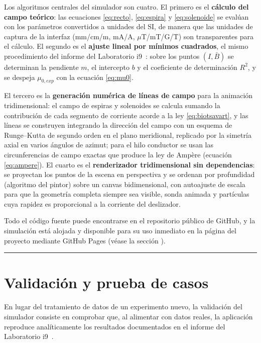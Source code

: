 \documentclass{article}
\begin{document}
Los algoritmos centrales del simulador son cuatro. El primero es el \textbf{cálculo del campo teórico}: las ecuaciones \eqref{eq:recto}, \eqref{eq:espira} y \eqref{eq:solenoide} se evalúan con los parámetros convertidos a unidades del SI, de manera que las unidades de captura de la interfaz (mm/cm/m, mA/A, $\mu$T/mT/G/T) son transparentes para el cálculo. El segundo es el \textbf{ajuste lineal por mínimos cuadrados}, el mismo procedimiento del informe del Laboratorio i9~\cite{labi9rep}: sobre los puntos $(I, \bar{B})$ se determinan la pendiente $m$, el intercepto $b$ y el coeficiente de determinación $R^2$, y se despeja $\mu_{0,exp}$ con la ecuación \eqref{eq:mu0}.

El tercero es la \textbf{generación numérica de líneas de campo} para la animación tridimensional: el campo de espiras y solenoides se calcula sumando la contribución de cada segmento de corriente acorde a la ley \eqref{eq:biotsavart}, y las líneas se construyen integrando la dirección del campo con un esquema de Runge--Kutta de segundo orden en el plano meridional, replicado por la simetría axial en varios ángulos de azimut; para el hilo conductor se usan las circunferencias de campo exactas que produce la ley de Ampère (ecuación \eqref{eq:ampere}). El cuarto es el \textbf{renderizador tridimensional sin dependencias}: se proyectan los puntos de la escena en perspectiva y se ordenan por profundidad (algoritmo del pintor) sobre un canvas bidimensional, con autoajuste de escala para que la geometría completa siempre sea visible, sonda animada y partículas cuya rapidez es proporcional a la corriente del deslizador.

Todo el código fuente puede encontrarse en el repositorio público de GitHub, y la simulación está alojada y disponible para su uso inmediato en la página del proyecto mediante GitHub Pages (véase la sección ).

\vspace{2em}
\hrule
\vspace{1em}

\section{Validación y prueba de casos} \label{sec:validacion}

En lugar del tratamiento de datos de un experimento nuevo, la validación del simulador consiste en comprobar que, al alimentar con datos reales, la aplicación reproduce analíticamente los resultados documentados en el informe del Laboratorio i9~\cite{labi9rep}.
\end{document}
